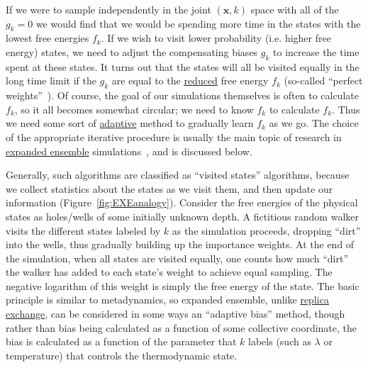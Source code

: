 \documentclass[9pt,review]{livecoms}
\newcommand{\vx}{\mathbf{x}}
\begin{document}
If we were to sample independently in the joint $(\vx,k)$ space with all of the $g_k=0$
we would find that we would be spending more time in the states with the lowest free energies $f_k$.  If we wish to visit
  lower probability (i.e. higher free energy) states, we need to adjust the compensating biases $g_k$ to increase the time spent at these states. It turns out that the states will all be visited equally in the long time limit if the $g_k$ are equal to the \hyperlink{ref:reduced} {reduced} free
    energy $f_k$ (so-called ``perfect weights''~\cite{park-pande:pre:2007:choosing-weights-simulated-tempering}).
    Of course, the goal of our simulations
    themselves is often to calculate $f_k$, so it all
    becomes somewhat circular; we need to know $f_k$ to calculate $f_k$.
    Thus we need some sort of \hyperlink{ref:Adaptive} {adaptive} method to gradually learn $f_k$
    as we go. The choice of the appropriate iterative procedure is usually the main topic of research in \hyperlink{ref:ExpEns} {expanded ensemble} simulations~\cite{lyubartsev:jcp:1992:expanded-ensembles,marinari-parisi:europhys-lett:1992:simulated-tempering,wang-landau:prl:2001:wang-landau,park-ensign-pande:pre:2006:bayesian-weight-update,park-pande:pre:2007:choosing-weights-simulated-tempering,li-fajer-yang:jcp:2007:simulated-scaling,chelli:jctc:2010:optimal-weights-expanded-ensembles}, and is discussed below.

Generally, such algorithms are classified as ``visited states''
algorithms, because we collect statistics about the states as we visit
them, and then update our information (Figure~\ref{fig:EXEanalogy}). Consider the free energies of
the physical states as holes/wells of some initially unknown depth.  A
fictitious random walker visits the different states labeled by
$k$ as the simulation proceeds, dropping ``dirt'' into the
wells, thus gradually building up the importance weights.  At the end
of the simulation, when all states are visited equally, one counts how
much ``dirt'' the walker has added to each state's weight to
achieve equal sampling. The negative logarithm of this weight is simply
the free energy of the state. The basic principle is similar to metadynamics, so expanded ensemble, unlike \hyperlink{ref:ReplEx} {replica exchange}, can be considered in some ways an ``adaptive bias'' method, though rather than bias being calculated as a function of some collective coordinate, the bias is calculated as a function of the parameter that $k$ labels (such as $\lambda$ or temperature) that controls the thermodynamic state.
\end{document}
